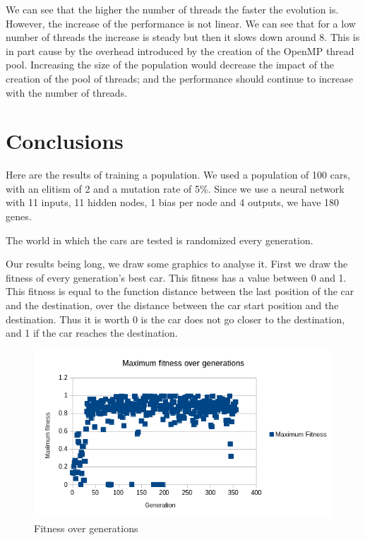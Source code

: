 \documentclass{acm_proc_article-sp}
\begin{document}
We can see that the higher the number of threads the faster the evolution is. However, the increase of the performance is not linear. We can see that for a low number of threads the increase is steady but then it slows down around 8. This is in part cause by the overhead introduced by the creation of the OpenMP thread pool. Increasing the size of the population would decrease the impact of the creation of the pool of threads; and the performance should continue to increase with the number of threads.
    
\section{Conclusions}
Here are the results of training a population.
We used a population of 100 cars, with an elitism of 2 and a mutation rate of 5\%. Since we use a neural network with 11 inputs, 11 hidden nodes, 1 bias per node and 4 outputs, we have 180 genes.

The world in which the cars are tested is randomized every generation.

Our results being long, we draw some graphics to analyse it.
First we draw the fitness of every generation's best car. This fitness has a value between 0 and 1. This fitness is equal to the function distance between the last position of the car and the destination, over the distance between the car start position and the destination. Thus it is worth 0 is the car does not go closer to the destination, and 1 if the car reaches the destination.

\begin{figure}[!htbp]
\centering
\includegraphics[width=\linewidth]{./images/fitness.png}
\caption{Fitness over generations}
\label{fig2}
\end{figure}
\end{document}
